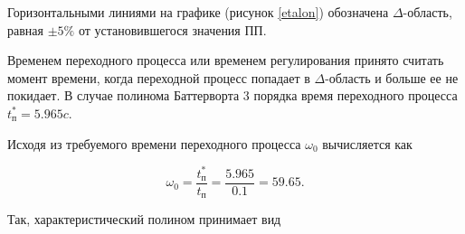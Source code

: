 Горизонтальными линиями на графике (рисунок \ref{etalon}) обозначена $\Delta$-область, равная
$\pm5\%$ от установившегося значения ПП.

Временем переходного процесса или временем регулирования принято считать момент времени, когда
переходной процесс попадает в $\Delta$-область и больше ее не покидает. В случае полинома Баттерворта
3 порядка время переходного процесса $t_{\text{п}}^{\text{*}}=5.965 c$.

\clearpage


Исходя из требуемого времени переходного процесса $\omega_0$ вычисляется как

$$
  \omega_0=\frac{t_{\text{п}}^{\text{*}}}{t_{\text{п}}}=\frac{5.965}{0.1}=59.65.
$$

Так, характеристический полином принимает вид









